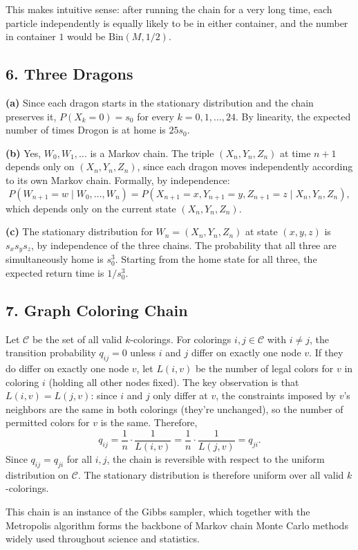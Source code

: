 \documentclass{article}
\begin{document}
This makes intuitive sense: after running the chain for a very long time, each particle independently is equally likely to be in either container, and the number in container $1$ would be $\text{Bin}(M,1/2)$.

\subsection*{6. Three Dragons}

\textbf{(a)} Since each dragon starts in the stationary distribution and the chain preserves it, $P(X_k=0)=s_0$ for every $k=0,1,\dots,24$. By linearity, the expected number of times Drogon is at home is $25s_0$.

\textbf{(b)} Yes, $W_0,W_1,\dots$ is a Markov chain. The triple $(X_n,Y_n,Z_n)$ at time $n+1$ depends only on $(X_n,Y_n,Z_n)$, since each dragon moves independently according to its own Markov chain. Formally, by independence:
$$
P(W_{n+1}=w\mid W_0,\dots,W_n)=P(X_{n+1}=x,Y_{n+1}=y,Z_{n+1}=z\mid X_n,Y_n,Z_n),
$$
which depends only on the current state $(X_n,Y_n,Z_n)$.

\textbf{(c)} The stationary distribution for $W_n=(X_n,Y_n,Z_n)$ at state $(x,y,z)$ is $s_xs_ys_z$, by independence of the three chains. The probability that all three are simultaneously home is $s_0^3$. Starting from the home state for all three, the expected return time is $1/s_0^3$.

\subsection*{7. Graph Coloring Chain}

Let $\mathcal{C}$ be the set of all valid $k$-colorings. For colorings $i,j\in\mathcal{C}$ with $i\ne j$, the transition probability $q_{ij}=0$ unless $i$ and $j$ differ on exactly one node $v$. If they do differ on exactly one node $v$, let $L(i,v)$ be the number of legal colors for $v$ in coloring $i$ (holding all other nodes fixed). The key observation is that $L(i,v)=L(j,v)$: since $i$ and $j$ only differ at $v$, the constraints imposed by $v$'s neighbors are the same in both colorings (they're unchanged), so the number of permitted colors for $v$ is the same. Therefore,
$$
q_{ij}=\frac{1}{n}\cdot\frac{1}{L(i,v)}=\frac{1}{n}\cdot\frac{1}{L(j,v)}=q_{ji}.
$$
Since $q_{ij}=q_{ji}$ for all $i,j$, the chain is reversible with respect to the uniform distribution on $\mathcal{C}$. The stationary distribution is therefore uniform over all valid $k$-colorings.

This chain is an instance of the Gibbs sampler, which together with the Metropolis algorithm forms the backbone of Markov chain Monte Carlo methods widely used throughout science and statistics.
\end{document}
